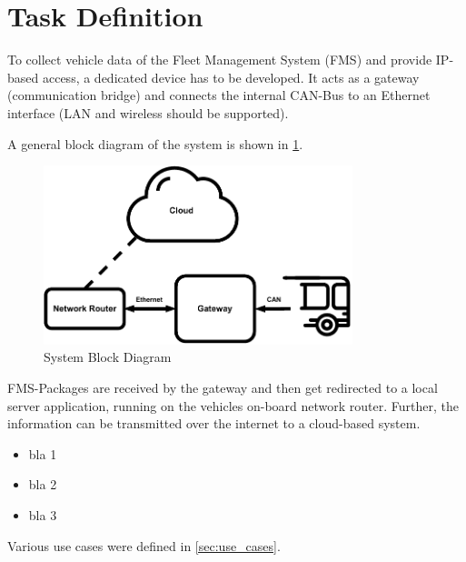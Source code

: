 \section{Task Definition}
To collect vehicle data of the Fleet Management System (FMS) and provide IP-based access, a dedicated device has to be developed. It acts as a gateway (communication bridge) and connects the internal CAN-Bus to an Ethernet interface (LAN and wireless should be supported).


A general block diagram of the system is shown in \cref{fig:constellation_HW}.

\medskip
\begin{figure}[h!]
	\centering
	\includegraphics[width=9cm]{images/Block_Diagram}
	\caption{System Block Diagram}
	\label{fig:constellation_HW}
\end{figure}

FMS-Packages are received by the gateway and then get redirected to a local server application, running on the vehicles on-board network router.
Further, the information can be transmitted over the internet to a cloud-based system.

\begin{itemize}
	\item bla 1
	\item bla 2
	\item bla 3
\end{itemize}

Various use cases were defined in \cref{sec:use_cases}.